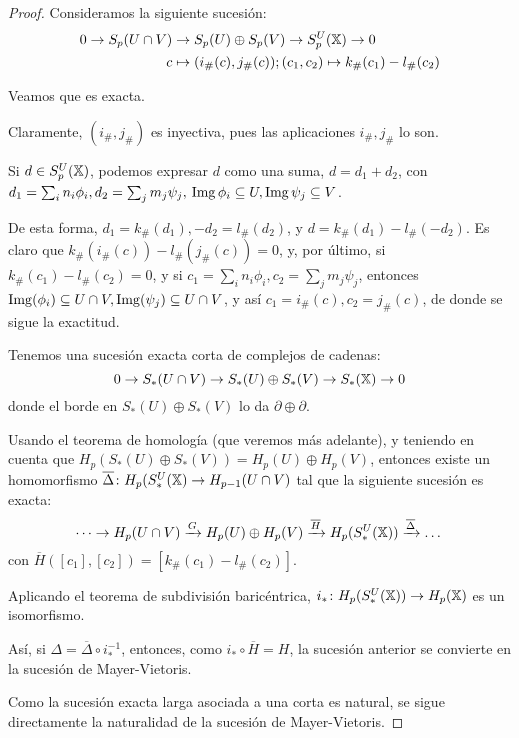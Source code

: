 \begin{proof}
  Consideramos la siguiente sucesión:
  \begin{align*}
    0 \to S_p(U \cap V) &\to S_p(U) \oplus S_p(V) \to S_p^U({\mathbb X}) \to 0 \\
                    c &\mapsto (i_\#(c), j_\#(c)); (c_1, c_2) \mapsto k_\#(c_1) - l_\#(c_2)
  \end{align*}

  Veamos que es exacta.

  Claramente, $(i_\#, j_\#)$ es inyectiva, pues las aplicaciones $i_\#, j_\#$ lo son.

  Si $d \in S_p^U({\mathbb X})$, podemos expresar $d$ como una suma, $d = d_1 + d_2$, con \\
  $d_1 = \sum_i n_i \phi_i, d_2 = \sum_j m_j \psi_j, \hspace{0.2em}  \operatorname{Img} \phi_i \subseteq U, \operatorname{Img} \psi_j \subseteq V$.

  De esta forma, $d_1 = k_\#(d_1), -d_2 = l_\#(d_2)$, y $d = k_\#(d_1) - l_\#(-d_2)$.
  Es claro que $k_\#(i_\#(c)) - l_\#(j_\#(c)) = 0$, y, por último, si $k_\#(c_1) - l_\#(c_2) = 0$, y si
  $c_1 = \sum_i n_i \phi_i,  c_2 = \sum_j m_j \psi_j$, entonces $\operatorname{Img}(\phi_i) \subseteq U \cap V, \operatorname{Img}(\psi_j) \subseteq U \cap V$,
  y así $c_1 = i_\#(c), c_2 = j_\#(c)$, de donde se sigue la exactitud.

  Tenemos una sucesión exacta corta de complejos de cadenas:
  \[ 0 \to S_*(U \cap V) \to S_*(U) \oplus S_*(V) \to S_*({\mathbb X}) \to 0 \]
  donde el borde en $S_*(U) \oplus S_*(V)$ lo da $\partial \oplus \partial$.

  Usando el teorema de homología (que veremos más adelante), y teniendo en cuenta que $H_p(S_*(U) \oplus S_*(V)) = H_p(U) \oplus H_p(V)$,
  entonces existe un homomorfismo $\overline{\Delta} \colon H_p(S_*^U({\mathbb X}) \to H_{p-1}(U \cap V)$ tal que la siguiente sucesión es exacta:
  \[ \dots \to H_p(U \cap V) \xrightarrow{G} H_p(U) \oplus H_p(V) \xrightarrow{\overline{H}} H_p(S_*^U({\mathbb X})) \xrightarrow{\overline{\Delta}} \dots \]
  con $\overline{H}([c_1], [c_2]) = [k_\#(c_1) - l_\#(c_2)]$.

  Aplicando el teorema de subdivisión baricéntrica, $i_* \colon H_p(S_*^U({\mathbb X})) \to H_p({\mathbb X})$ es un isomorfismo.

  Así, si $\Delta = \overline{\Delta} \circ i_*^{-1}$, entonces, como $i_* \circ \overline{H} = H$, la sucesión anterior se convierte
  en la sucesión de Mayer-Vietoris.

  Como la sucesión exacta larga asociada a una corta es natural, se sigue directamente la naturalidad de la sucesión de Mayer-Vietoris.
\end{proof}

